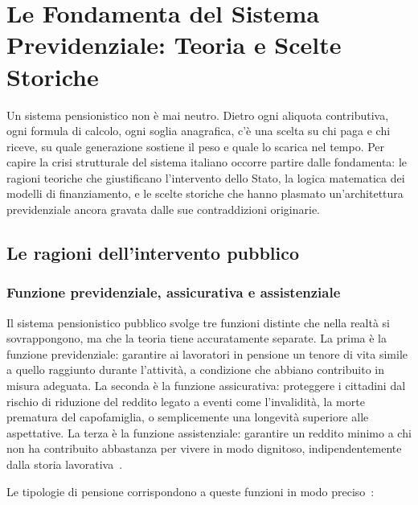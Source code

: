 ﻿\chapter{Le Fondamenta del Sistema Previdenziale: Teoria e Scelte Storiche}

Un sistema pensionistico non è mai neutro. Dietro ogni aliquota contributiva, ogni formula di calcolo, ogni soglia anagrafica, c'è una scelta su chi paga e chi riceve, su quale generazione sostiene il peso e quale lo scarica nel tempo. Per capire la crisi strutturale del sistema italiano occorre partire dalle fondamenta: le ragioni teoriche che giustificano l'intervento dello Stato, la logica matematica dei modelli di finanziamento, e le scelte storiche che hanno plasmato un'architettura previdenziale ancora gravata dalle sue contraddizioni originarie.

\section{Le ragioni dell'intervento pubblico}

\subsection{Funzione previdenziale, assicurativa e assistenziale}

Il sistema pensionistico pubblico svolge tre funzioni distinte che nella realtà si sovrappongono, ma che la teoria tiene accuratamente separate. La prima è la funzione previdenziale: garantire ai lavoratori in pensione un tenore di vita simile a quello raggiunto durante l'attività, a condizione che abbiano contribuito in misura adeguata. La seconda è la funzione assicurativa: proteggere i cittadini dal rischio di riduzione del reddito legato a eventi come l'invalidità, la morte prematura del capofamiglia, o semplicemente una longevità superiore alle aspettative. La terza è la funzione assistenziale: garantire un reddito minimo a chi non ha contribuito abbastanza per vivere in modo dignitoso, indipendentemente dalla storia lavorativa~\cite{Bosi2018, RosenGayerRapallini2023}.

Le tipologie di pensione corrispondono a queste funzioni in modo preciso~\cite{RosenGayerRapallini2023}:

